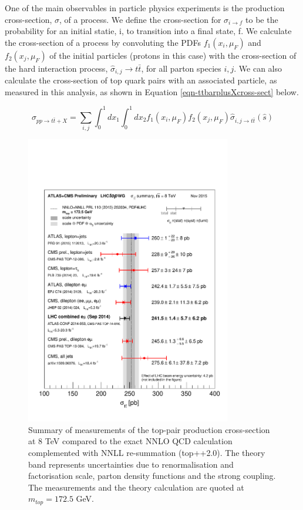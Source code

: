 One of the main observables in particle physics experiments is the production cross-section, $\sigma$, of a process. We define the cross-section for $\sigma_{i\to f}$ to be the probability for an initial statie, i, to transition into a final state, f. We calculate the cross-section of a process by convoluting the PDFs $f_1(x_i, \mu_F)$ and $f_2(x_j, \mu_F)$ of the initial particles (protons in this case) with the cross-section of the hard interaction process, $\hat{\sigma}_{i,j} \to t\bar{t}$, for all parton species $i,j$. We can also calculate the cross-section of top quark pairs with an associated particle, as measured in this analysis, as shown in Equation \ref{eqn-ttbarplusXcross-sect} below.

\begin{equation} \label{eqn-ttbarplusXcross-sect}
\sigma_{pp \to t\bar{t}+X} = \sum_{i,j} \int^1_0 dx_1 \int^1_0 dx_2 f_1(x_i, \mu_F)f_2(x_j, \mu_F)\hat{\sigma}_{i,j \to t\bar{t}}(\hat{s})
\end{equation}

\begin{figure} 
\begin{center}
\includegraphics[width=0.8\textwidth]{Figures/ttbarCombinedXsect.pdf}
\end{center}
\caption{Summary of measurements of the top-pair production cross-section at 8 TeV compared to the exact NNLO QCD calculation complemented with NNLL re-summation (top++2.0). The theory band represents uncertainties due to renormalisation and factorisation scale, parton density functions and the strong coupling. The measurements and the theory calculation are quoted at $m_{top}=172.5$ GeV. \cite{ttbarXsectCombination}}
\label{fig-ttbarCombinedXsect}
\end{figure}

